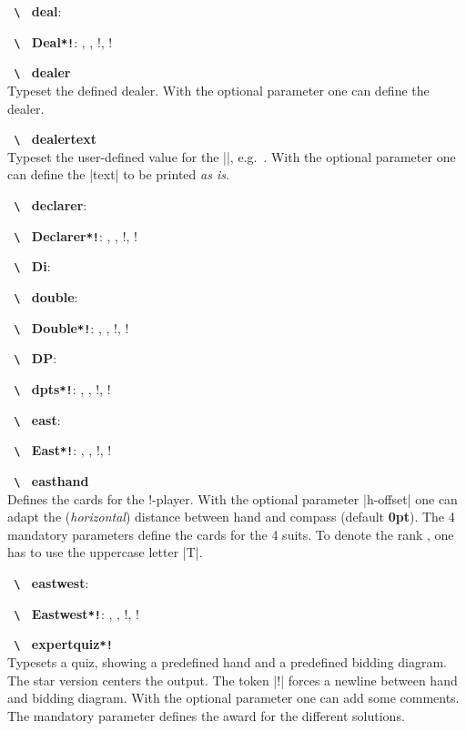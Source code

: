 \documentclass[a4paper,fontsize=11pt,%
  danish,%
  dutch,%
  french,%
  german,%
  norsk,%
  spanish,%
  swedish,%
  turkish,%
  english,%
]{scrartcl}
\newcommand\bs{%
  \texttt{%
    \upshape%
    \textbackslash%
  }%
}%
\let\olditem\item
\renewcommand\item[1][\relax]{\olditem\textbf{\bs#1}}
\newcommand\Oarg[1]{\colorbox{optbackgr}{\texttt{#1}}}
\begin{document}
\begin{description}[itemsep=-0.3em]
\item[deal]: \deal
\item[Deal\Oarg{*!}]: \Deal, \Deal*, \Deal!, \Deal*! 

\item[dealer\Q{[text]}]\\
Typeset the defined dealer. With the optional
parameter one can define the dealer.

\item[dealertext\Q{[text]}]\\
Typeset the user-defined value for the |\dealer|,
e.g.\ \mbox{\dealertext[\east]}. With the optional parameter one can define
the |text| to be printed \emph{as is}.

\item[declarer]: \declarer
\item[Declarer\Oarg{*!}]: \Declarer, \Declarer*, \Declarer!, \Declarer*! 

\item[Di]: \Di

\item[double]: \double
\item[Double\Oarg{*!}]: \Double, \Double*, \Double!, \Double*!

\item[DP]: \DP
\item[dpts\Oarg{*!}]: \dpts, \dpts*, \dpts!, \dpts*!

\item[east]: \east
\item[East\Oarg{*!}]: \East, \East*, \East!, \East*!

\item[easthand]\\
Defines the cards for the
\East*!-player. With the optional parameter |h-offset| one can adapt the
(\emph{horizontal}) distance between hand and compass (default
\textbf{0pt}). The 4 mandatory parameters define the cards for the 4 suits.
To denote the rank , one has to use the uppercase letter |T|.

\item[eastwest]: \eastwest
\item[Eastwest\Oarg{*!}]: \EastWest, \EastWest*, \EastWest!, \EastWest*!

\item[expertquiz\Oarg{*!}]\\
Typesets a quiz, showing a
predefined hand and a predefined bidding diagram. The star version centers
the output. The token |!| forces a newline between hand and bidding
diagram. With the optional parameter one can add some comments. The
mandatory parameter defines the award for the different solutions.


\end{description}
\end{document}
